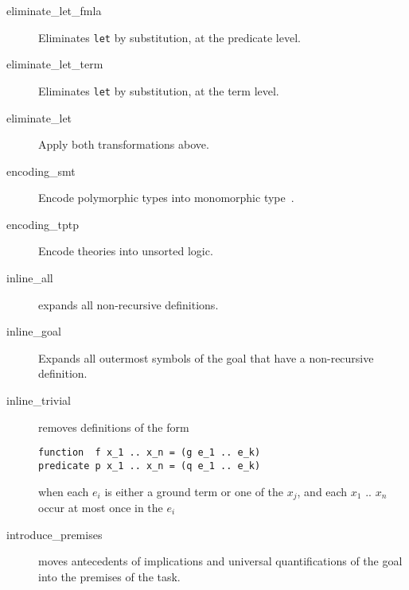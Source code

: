 \begin{description}
\item[eliminate\_let\_fmla]
  Eliminates \texttt{let} by substitution, at the predicate level.

\item[eliminate\_let\_term]
  Eliminates \texttt{let} by substitution, at the term level.

\item[eliminate\_let]
  Apply both transformations above.



\item[encoding\_smt]
  Encode polymorphic types into monomorphic type~\cite{conchon08smt}.

\item[encoding\_tptp]
  Encode theories into unsorted logic. %





\item[inline\_all]
  expands all non-recursive definitions.

\item[inline\_goal] Expands all outermost symbols of the goal that
  have a non-recursive definition.

\item[inline\_trivial]
  removes definitions of the form

\begin{verbatim}
function  f x_1 .. x_n = (g e_1 .. e_k)
predicate p x_1 .. x_n = (q e_1 .. e_k)
\end{verbatim}
when each $e_i$ is either a ground term or one of the $x_j$, and
each $x_1$ .. $x_n$ occur at most once in the $e_i$

\item[introduce\_premises] moves antecedents of implications and
  universal quantifications of the goal into the premises of the task.


\end{description}
